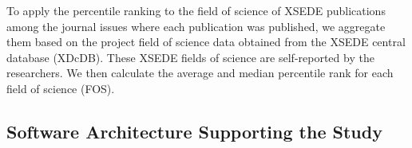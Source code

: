 \documentclass[sigconf]{acmart}
\begin{document}
To apply the percentile ranking to the field of science of XSEDE
publications among the journal issues where each publication was
published, we aggregate them based on the project field
of science data obtained from the XSEDE central database
(XDcDB). These XSEDE fields of science are self-reported by the
researchers. We then calculate the average and median percentile rank
for each field of science (FOS).

\subsection{Software Architecture Supporting the Study}
\end{document}
